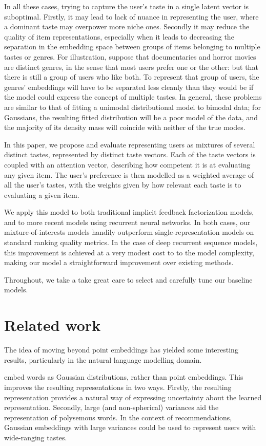 \documentclass[sigchi]{acmart}
\begin{document}
In all these cases, trying to capture the user's taste in a single latent vector is suboptimal. Firstly, it may lead to lack of nuance in representing the user, where a dominant taste may overpower more niche ones. Secondly it may reduce the quality of item representations, especially when it leads to decreasing the separation in the embedding space between groups of items belonging to multiple tastes or genres. For illustration, suppose that documentaries and horror movies are distinct genres, in the sense that most users prefer one or the other: but that there is still a group of users who like both. To represent that group of users, the genres' embeddings will have to be separated less cleanly than they would be if the model could express the concept of multiple tastes. In general, these problems are similar to that of fitting a unimodal distributional model to bimodal data; for Gaussians, the resulting fitted distribution will be a poor model of the data, and the majority of its density mass will coincide with neither of the true modes.

In this paper, we propose and evaluate representing users as mixtures of several distinct tastes, represented by distinct taste vectors. Each of the taste vectors is coupled with an attention vector, describing how competent it is at evaluating any given item. The user's preference is then modelled as a weighted average of all the user's tastes, with the weights given by how relevant each taste is to evaluating a given item.

We apply this model to both traditional implicit feedback factorization models, and to more recent models using recurrent neural networks. In both cases, our mixture-of-interests models handily outperform single-representation models on standard ranking quality metrics. In the case of deep recurrent sequence models, this improvement is achieved at a very modest cost to to the model complexity, making our model a straightforward improvement over existing methods.

Throughout, we take a take great care to select and carefully tune our baseline models.

\section{Related work}
The idea of moving beyond point embeddings has yielded some interesting results, particularly in the natural language modelling domain.

\citet{vilnis2014word} embed words as Gaussian distributions, rather than point embeddings. This improves the resulting representations in two ways. Firstly, the resulting representation provides a natural way of expressing uncertainty about the learned representation. Secondly, large (and non-spherical) variances aid the representation of polysemous words. In the context of recommendations, Gaussian embeddings with large variances could be used to represent users with wide-ranging tastes.
\end{document}

